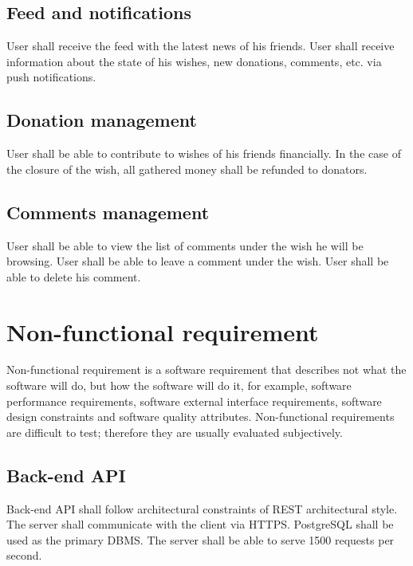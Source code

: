 \subsection*{Feed and notifications}
\begin{itemize}
User shall receive the feed with the latest news of his friends.
User shall receive information about the state of his wishes, new donations, comments, etc. via push notifications.
\end{itemize}

\subsection*{Donation management}
\begin{itemize}
User shall be able to contribute to wishes of his friends financially.
In the case of the closure of the wish, all gathered money shall be refunded to donators.
\end{itemize}

\subsection*{Comments management}
\begin{itemize}
User shall be able to view the list of comments under the wish he will be browsing.
User shall be able to leave a comment under the wish.
User shall be able to delete his comment.
\end{itemize}

\section{Non-functional requirement}
Non-functional requirement is a software requirement that describes not what the software will do, but how the software will do it, for example, software performance requirements, software external interface requirements, software design constraints and software quality attributes. Non-functional requirements are difficult to test; therefore they are usually evaluated subjectively.\cite{nonfuncreq}

\subsection*{Back-end \ac{API}}
\begin{itemize}
Back-end API shall follow architectural constraints of REST architectural style.
The server shall communicate with the client via \ac{HTTPS}.
PostgreSQL shall be used as the primary DBMS.
The server shall be able to serve 1500 requests per second.
\end{itemize}

